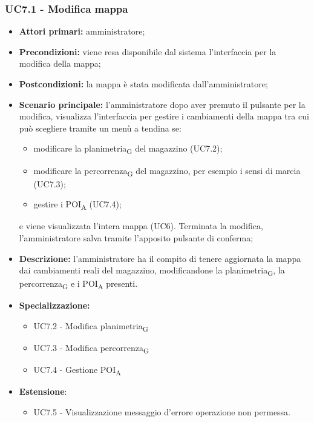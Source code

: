 \subsubsection{UC7.1 - Modifica mappa}
\begin{itemize}
	\item 	\textbf{Attori primari:} amministratore;
	\item 	\textbf{Precondizioni:} viene resa disponibile dal sistema l'interfaccia per la modifica della mappa;
	\item 	\textbf{Postcondizioni:} la mappa è stata modificata dall'amministratore;
	\item 	\textbf{Scenario principale:} l'amministratore dopo aver premuto il pulsante per la modifica, visualizza l'interfaccia per gestire i cambiamenti della mappa tra cui può scegliere tramite un menù a tendina se:
	\begin{itemize}
		\item modificare la \gls{planimetria}\textsubscript{G} del magazzino (UC7.2);
		\item modificare la \gls{percorrenza}\textsubscript{G} del magazzino, per esempio i sensi di marcia (UC7.3);
		\item gestire i \acrshort{POI}\textsubscript{A} (UC7.4);
	\end{itemize}
	e viene visualizzata l'intera mappa (UC6).
Terminata la modifica, l'amministratore salva tramite l'apposito pulsante di conferma;
	\item 	\textbf{Descrizione:} l'amministratore ha il compito di tenere aggiornata la mappa dai cambiamenti reali del magazzino, modificandone la \gls{planimetria}\textsubscript{G}, la \gls{percorrenza}\textsubscript{G} e i \acrshort{POI}\textsubscript{A} presenti.
	\item 	\textbf{Specializzazione:} 
	\begin{itemize}
		\item UC7.2 - Modifica \gls{planimetria}\textsubscript{G}
		\item UC7.3 - Modifica \gls{percorrenza}\textsubscript{G}
		\item UC7.4 - Gestione \acrshort{POI}\textsubscript{A}
	\end{itemize}
	\item \textbf{Estensione}:
	\begin{itemize}
		\item UC7.5 - Visualizzazione messaggio d'errore operazione non permessa.
	\end{itemize}
\end{itemize}


